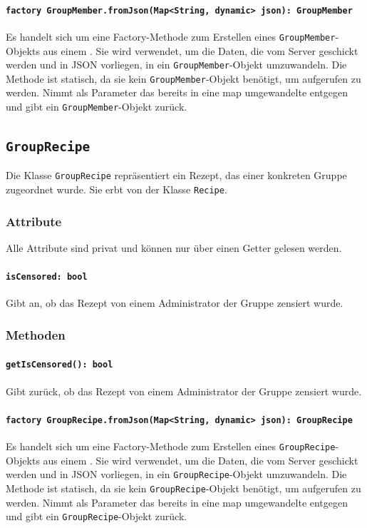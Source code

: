 \documentclass{entwurfsheft}
\begin{document}
\paragraph{\texttt{factory GroupMember.fromJson(Map<String, dynamic> json): GroupMember}} Es handelt sich um eine Factory-Methode zum Erstellen eines \texttt{GroupMember}-Objekts aus einem . Sie wird verwendet, um die Daten, die vom Server geschickt werden und in \Gls{JSON} vorliegen, in ein \texttt{GroupMember}-Objekt umzuwandeln. Die Methode ist statisch, da sie kein \texttt{GroupMember}-Objekt benötigt, um aufgerufen zu werden. Nimmt als Parameter das bereits in eine \Gls{map} umgewandelte  entgegen und gibt ein \texttt{GroupMember}-Objekt zurück.
\newpage
\subsection{\texttt{GroupRecipe}}\label{sec:GroupRecipe}
Die Klasse \texttt{GroupRecipe} repräsentiert ein Rezept, das einer konkreten Gruppe zugeordnet wurde. Sie erbt von der Klasse \texttt{Recipe}.
\subsubsection*{Attribute}
Alle Attribute sind privat und können nur über einen Getter gelesen werden.
\paragraph{\texttt{isCensored: bool}}
Gibt an, ob das Rezept von einem Administrator der Gruppe zensiert wurde.
\subsubsection*{Methoden}
\paragraph{\texttt{getIsCensored(): bool}}
Gibt zurück, ob das Rezept von einem Administrator der Gruppe zensiert wurde.
\paragraph{\texttt{factory GroupRecipe.fromJson(Map<String, dynamic> json): GroupRecipe}} Es handelt sich um eine Factory-Methode zum Erstellen eines \texttt{GroupRecipe}-Objekts aus einem . Sie wird verwendet, um die Daten, die vom Server geschickt werden und in \Gls{JSON} vorliegen, in ein \texttt{GroupRecipe}-Objekt umzuwandeln. Die Methode ist statisch, da sie kein \texttt{GroupRecipe}-Objekt benötigt, um aufgerufen zu werden. Nimmt als Parameter das bereits in eine \Gls{map} umgewandelte  entgegen und gibt ein \texttt{GroupRecipe}-Objekt zurück.
\end{document}
